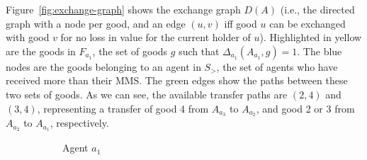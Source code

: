 Figure~\ref{fig:exchange-graph} shows the exchange graph $D(A)$ (i.e., the directed graph with a node per good, and an edge $(u,v)$ iff good $u$ can be exchanged with good $v$ for no loss in value for the current holder of $u$). Highlighted in yellow are the goods in $F_{a_1}$, the set of goods $g$ such that $\Delta_{a_1}(A_{a_1}, g) = 1$. The blue nodes are the goods belonging to an agent in $S_>$, the set of agents who have received more than their MMS. The green edges show the paths between these two sets of goods. As we can see, the available transfer paths are $(2,4)$ and $(3,4)$, representing a transfer of good 4 from $A_{a_3}$ to $A_{a_2}$, and good 2 or 3 from $A_{a_2}$ to $A_{a_1}$, respectively.


\begin{figure}[ht!]
    \begin{subfigure}{0.3\textwidth}
      \centering
      \caption{Agent $a_1$}
    \end{subfigure}
    \hfill
    \begin{subfigure}{0.3\textwidth}
      \centering
\end{subfigure}
\end{figure}
